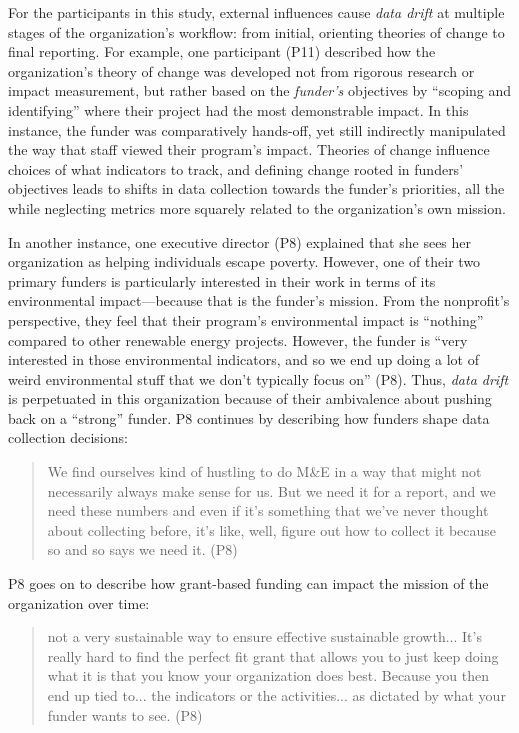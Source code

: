 For the participants in this study, external influences cause \textit{data drift} at multiple stages of the organization’s workflow: from initial, orienting theories of change to final reporting. For example, one participant (P11) described how the organization’s theory of change was developed not from rigorous research or impact measurement, but rather based on the \textit{funder’s} objectives by “scoping and identifying” where their project had the most demonstrable impact. In this instance, the funder was comparatively hands-off, yet still indirectly manipulated the way that staff viewed their program’s impact. Theories of change influence choices of what indicators to track, and defining change rooted in funders’ objectives leads to shifts in data collection towards the funder’s priorities, all the while neglecting metrics more squarely related to the organization’s own mission.

In another instance, one executive director (P8) explained that she sees her organization as helping individuals escape poverty. However, one of their two primary funders is particularly interested in their work in terms of its environmental impact---because that is the funder’s mission. From the nonprofit’s perspective, they feel that their program’s environmental impact is “nothing” compared to other renewable energy projects. However, the funder is “very interested in those environmental indicators, and so we end up doing a lot of weird environmental stuff that we don’t typically focus on” (P8). Thus, \textit{data drift} is perpetuated in this organization because of their ambivalence about pushing back on a “strong” funder. P8 continues by describing how funders shape data collection decisions:

\begin{quote}\singlespacing We find ourselves kind of hustling to do M\&E in a way that might not necessarily always make sense for us. But we need it for a report, and we need these numbers and even if it’s something that we’ve never thought about collecting before, it’s like, well, figure out how to collect it because so and so says we need it. (P8)\end{quote}

P8 goes on to describe how grant-based funding can impact the mission of the organization over time:

\begin{quote}\singlespacing [It is] not a very sustainable way to ensure effective sustainable growth... It’s really hard to find the perfect fit grant that allows you to just keep doing what it is that you know your organization does best. Because you then end up tied to... the indicators or the activities... as dictated by what your funder wants to see. (P8)\end{quote}

